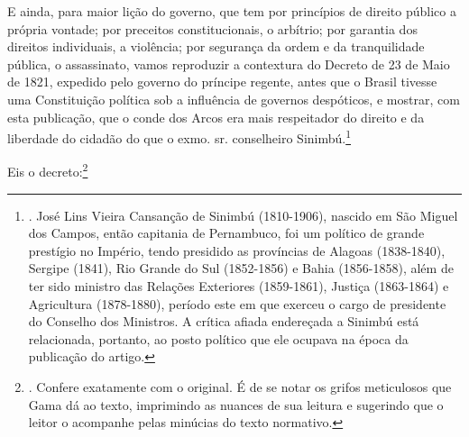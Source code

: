 E ainda, para maior lição do governo, que tem por princípios de direito
público a própria vontade; por preceitos constitucionais, o arbítrio;
por garantia dos direitos individuais, a violência; por segurança da
ordem e da tranquilidade pública, o assassinato, vamos reproduzir a
contextura do Decreto de 23 de Maio de 1821, expedido pelo governo do
príncipe regente, antes que o Brasil tivesse uma Constituição política
sob a influência de governos despóticos, e mostrar, com esta publicação,
que o conde dos Arcos era mais respeitador do direito e da liberdade do
cidadão do que o exmo. sr. conselheiro Sinimbú.\footnote{. José Lins
  Vieira Cansanção de Sinimbú (1810-1906), nascido em São Miguel dos
  Campos, então capitania de Pernambuco, foi um político de grande
  prestígio no Império, tendo presidido as províncias de Alagoas
  (1838-1840), Sergipe (1841), Rio Grande do Sul (1852-1856) e Bahia
  (1856-1858), além de ter sido ministro das Relações Exteriores
  (1859-1861), Justiça (1863-1864) e Agricultura (1878-1880), período
  este em que exerceu o cargo de presidente do Conselho dos Ministros. A
  crítica afiada endereçada a Sinimbú está relacionada, portanto, ao
  posto político que ele ocupava na época da publicação do artigo.}

Eis o decreto:\footnote{. Confere exatamente com o original. É de se
  notar os grifos meticulosos que Gama dá ao texto, imprimindo as
  nuances de sua leitura e sugerindo que o leitor o acompanhe pelas
  minúcias do texto normativo.}

